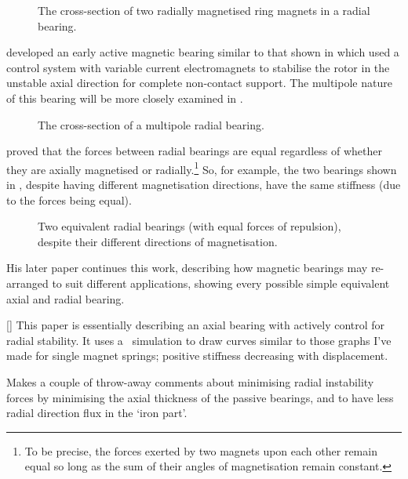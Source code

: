\begin{figure}
  \caption[Radial bearing cross section.]{The cross-section of two radially
magnetised ring magnets in a radial bearing.}
\end{figure}

\textcite{backers1961} developed an early active magnetic bearing
similar to that shown in  which used a control
system with variable current electromagnets to stabilise the rotor in the unstable
axial direction for complete non-contact support. The multipole nature of this 
bearing will be more closely examined in .

\begin{figure}
  \caption[Multipole bearing cross section.]{The cross-section of a
    multipole radial bearing.}
\end{figure}

\textcite{yonnet1978} proved that the forces between radial bearings are
equal regardless of whether they are axially magnetised or radially.\footnote{To
be precise, the forces exerted by two magnets upon each other remain equal so
long as the sum of their angles of magnetisation remain constant.} So, for
example, the two bearings shown in , despite having
different magnetisation directions, have the same stiffness (due to the forces
being equal). 

\begin{figure}[hbtp]
  \caption[Two equivalent radial bearings]{Two equivalent radial bearings
(with equal forces of repulsion), despite their different directions of
magnetisation.}
\end{figure}

His later paper \cite{yonnet1981} continues this work, describing
how magnetic bearings may re-arranged to suit different applications,
showing every possible simple equivalent axial and radial bearing.

[\textcite{asami2005}] This paper is essentially describing an axial
bearing with actively control for radial stability. It uses a \FEA\ simulation
to draw curves similar to those graphs I've made for single magnet springs;
positive stiffness decreasing with displacement.

Makes a couple of throw-away comments about minimising radial instability
forces by minimising the axial thickness of the passive bearings, and to have
less radial direction flux in the `iron part'.

